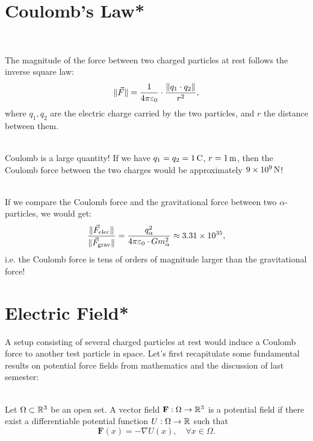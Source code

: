 \section{Coulomb's Law*}
\begin{law}
    \ \\\begin{minipage}{0.6 \linewidth}
        \vspace{3pt} The magnitude of the force between two charged particles at rest follows the inverse square law:
        $$\lVert \vec{F} \rVert=\frac{1}{4\pi\varepsilon_0}\cdot\frac{\lVert  q_1\cdot q_2 \rVert}{r^2}, $$
        where $q_1, q_2$ are the electric charge carried by the two particles, and $r$ the distance between them.
    \end{minipage}
    \begin{minipage}{0.4 \linewidth}
        \centering
    \end{minipage}
\end{law}
\vspace{-12pt}
\begin{remark}
    \ \\Coulomb is a large quantity! If we have $q_1=q_2=1\,\rm{C}$, $r=1\,\rm{m}$, then the Coulomb force between the two charges would be approximately $9\times10^9\,\rm{N}$!
\end{remark}
\vspace{-12pt}
\begin{example}
    \ \\If we compare the Coulomb force and the gravitational force between two $\alpha$-particles, we would get:
    $$\frac{\lVert \vec{F}_{\rm{elec}} \rVert}{\lVert \vec{F}_{\rm{grav}} \rVert}=\frac{q_\alpha^2}{4\pi\varepsilon_0\cdot Gm_\alpha^2}\approx3.31\times10^{35},$$
    i.e. the Coulomb force is tens of orders of magnitude larger than the gravitational force!
\end{example}
\section{Electric Field*}
A setup consisting of several charged particles at rest would induce a Coulomb force to another test particle in space. Let's first recapitulate some fundamental results on potential force fields from mathematics and the discussion of last semester:
\begin{definition}
    \ \\Let $\Omega\subset\mathbb{R}^3$ be an open set. A vector field $\mathbf{F}: \Omega\to\mathbb{R}^3$ is a potential field if there exist a differentiable potential function $U: \Omega\to\mathbb{R}$ such that
    \[\mathbf{F}(x)=-\nabla U(x),\quad\forall x\in\Omega.\]
\end{definition}